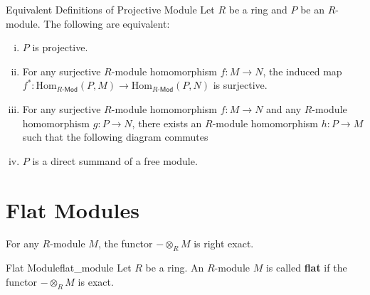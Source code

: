 \begin{proposition}{Equivalent Definitions of Projective Module}{}
    Let $R$ be a ring and $P$ be an $R$-module. The following are equivalent:
    \begin{enumerate}[(i)]
        \item $P$ is projective.
        \item For any surjective $R$-module homomorphism $f:M\to N$, the induced map $f^*:\mathrm{Hom}_{R\text{-}\mathsf{Mod}}\left(P,M\right)\to \mathrm{Hom}_{R\text{-}\mathsf{Mod}}\left(P,N\right)$ is surjective.
        \item For any surjective $R$-module homomorphism $f:M\to N$ and any $R$-module homomorphism $g:P\to N$, there exists an $R$-module homomorphism $h:P\to M$ such that the following diagram commutes
       \begin{center}
       \end{center}
        \item $P$ is a direct summand of a free module.
    \end{enumerate}
\end{proposition}

\section{Flat Modules}
For any $R$-module $M$, the functor $-\otimes_R M$ is right exact.
\begin{definition}{Flat Module}{flat_module}
    Let $R$ be a ring. An $R$-module $M$ is called \textbf{flat} if the functor $-\otimes_R M$ is exact.
\end{definition}

